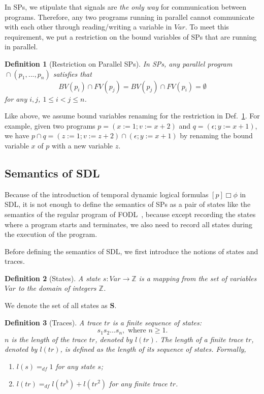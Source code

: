 \documentclass{fcs}
\newtheorem{mydef}{Definition}[section]
\newcommand{\bff}[1]{\mathbf{#1}}
\newcommand{\mbb}[1]{\mathbb{#1}}
\newcommand{\Var}[0]{\mathit{Var}}
\newcommand{\BV}[0]{\mathit{BV}}
\newcommand{\FV}[0]{\mathit{FV}} %
\DeclareMathOperator{\seq}{;}
\DeclareMathOperator{\para}{\cap}
\newcommand{\dddef}[0]{=_{df}}
\begin{document}
In SPs, we stipulate that signals are \emph{the only way} for communication between programs.
Therefore, any two programs running in parallel cannot communicate with each other through reading/writing a variable in $\Var$.
To meet this requirement, %
we put a restriction on the bound variables of SPs that are running in parallel.





\begin{mydef}[Restriction on Parallel SPs]
	\label{def:Restriction on Parallel SPs}
	In SPs, any parallel program $\para(p_1,...,p_n)$ satisfies that
	$$\BV(p_i)\cap \FV(p_j) = \BV(p_j)\cap \FV(p_i) = \emptyset $$
for any $i, j$, $1\le i<j\le n$.
\end{mydef}

Like above, we assume bound variables renaming for the restriction in Def.~\ref{def:Restriction on Parallel SPs}.
For example, given two programs $p = (x := 1 \seq v := x + 2)$ and $q = (\epsilon\seq y := x + 1)$, we have $p\para q = (z := 1\seq v := z + 2)\para (\epsilon\seq y := x + 1)$ by renaming the bound variable $x$ of $p$ with a new variable $z$.



\subsection{Semantics of SDL}
\label{section:Semantics of SDL}
Because of the introduction of temporal dynamic logical formulas $[p]\Box\phi$ in SDL, it is not enough to define the semantics of SPs as a pair of states like the semantics of the regular program of FODL~\cite{Harel00}, because except
recording the states where a program starts and terminates, we also need to record all states during the execution of the program.

Before defining the semantics of SDL, we first introduce the notions of states and traces.


\begin{mydef}[States]
	A state $s : \Var\to \mbb{Z}$ is a mapping from the set of variables $\Var$ to the domain of integers $\mbb{Z}$.
\end{mydef}

We denote the set of all states as $\bff{S}$.

\begin{mydef}[Traces]
	A trace $tr$ is a finite sequence of states: $$s_1s_2...s_n, \mbox{ where }n\ge 1.$$
	$n$ is the length of the trace $tr$, denoted by $l(tr)$.
\ifx
	The length of a finite trace $tr$, denoted by $l(tr)$, is defined as the length of its sequence of states. Formally,
	\begin{enumerate}
		\item $l(s) \dddef 1$ for any state $s$;
		\item $l(tr)\dddef l(tr^b) + l(tr^2)$ for any finite trace $tr$.
	\end{enumerate}
\fi
\end{mydef}
\end{document}
